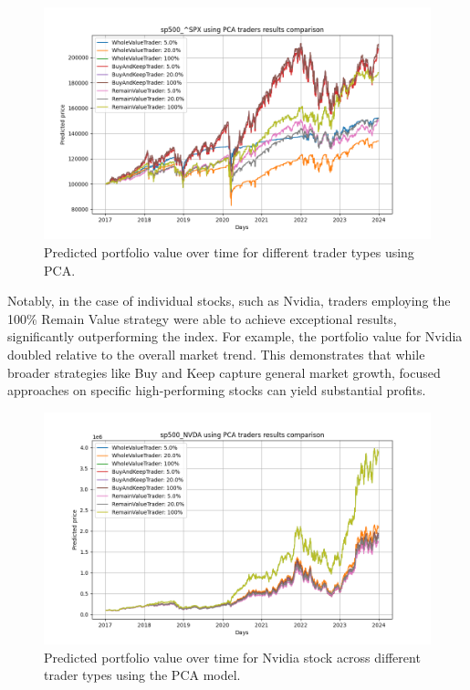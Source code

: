 \documentclass[journal]{IEEEtran}
\begin{document}
\begin{figure}[ht!]
    \centering
    \includegraphics[width=\linewidth]{pca_traders.png}
    \caption{Predicted portfolio value over time for different trader types using PCA.}
    \label{fig:pca_trader_portfolio}
\end{figure}

Notably, in the case of individual stocks, such as Nvidia, traders employing the 100\% Remain Value strategy were able to achieve exceptional results, significantly outperforming the index. For example, the portfolio value for Nvidia doubled relative to the overall market trend. This demonstrates that while broader strategies like Buy and Keep capture general market growth, focused approaches on specific high-performing stocks can yield substantial profits.

\begin{figure}[ht!]
    \centering
    \includegraphics[width=\linewidth]{pca_nvidia_traders.png}
    \caption{Predicted portfolio value over time for Nvidia stock across different trader types using the PCA model.}
    \label{fig:pca_nvidia_trader_portfolio}
\end{figure}
\end{document}
